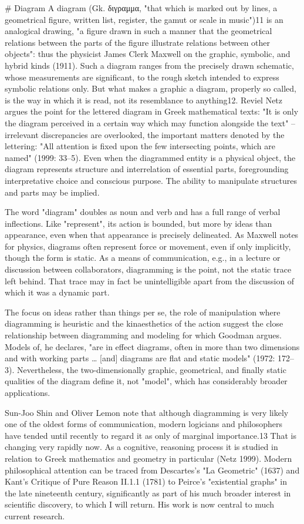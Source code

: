 # Diagram
A diagram (Gk. διγραμμα, "that which is marked out by lines, a geometrical figure, written list, register, the gamut or scale in music")11 is an analogical drawing, "a figure drawn in such a manner that the geometrical relations between the parts of the figure illustrate relations between other objects": thus the physicist James Clerk Maxwell on the graphic, symbolic, and hybrid kinds (1911). Such a diagram ranges from the precisely drawn schematic, whose measurements are significant, to the rough sketch intended to express symbolic relations only. But what makes a graphic a diagram, properly so called, is the way in which it is read, not its resemblance to anything12. Reviel Netz argues the point for the lettered diagram in Greek mathematical texts: "It is only the diagram perceived in a certain way which may function alongside the text" – irrelevant discrepancies are overlooked, the important matters denoted by the lettering: "All attention is fixed upon the few intersecting points, which are named" (1999: 33–5). Even when the diagrammed entity is a physical object, the diagram represents structure and interrelation of essential parts, foregrounding interpretative choice and conscious purpose. The ability to manipulate structures and parts may be implied.

The word "diagram" doubles as noun and verb and has a full range of verbal inflections. Like "represent", its action is bounded, but more by ideas than appearance, even when that appearance is precisely delineated. As Maxwell notes for physics, diagrams often represent force or movement, even if only implicitly, though the form is static. As a means of communication, e.g., in a lecture or discussion between collaborators, diagramming is the point, not the static trace left behind. That trace may in fact be unintelligible apart from the discussion of which it was a dynamic part.

The focus on ideas rather than things per se, the role of manipulation where diagramming is heuristic and the kinaesthetics of the action suggest the close relationship between diagramming and modeling for which Goodman argues. Models of, he declares, "are in effect diagrams, often in more than two dimensions and with working parts … [and] diagrams are flat and static models" (1972: 172–3). Nevertheless, the two-dimensionally graphic, geometrical, and finally static qualities of the diagram define it, not "model", which has considerably broader applications.

Sun-Joo Shin and Oliver Lemon note that although diagramming is very likely one of the oldest forms of communication, modern logicians and philosophers have tended until recently to regard it as only of marginal importance.13 That is changing very rapidly now. As a cognitive, reasoning process it is studied in relation to Greek mathematics and geometry in particular (Netz 1999). Modern philosophical attention can be traced from Descartes's "La Geometric" (1637) and Kant's Critique of Pure Reason II.1.1 (1781) to Peirce's "existential graphs" in the late nineteenth century, significantly as part of his much broader interest in scientific discovery, to which I will return. His work is now central to much current research.

